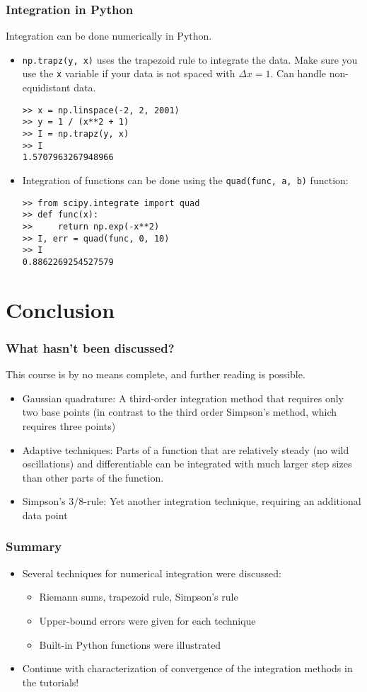 \begin{frame}[fragile]
  \frametitle{Integration in Python}
  Integration can be done numerically in Python.
  \begin{itemize}
    \item \lstinline$np.trapz(y, x)$ uses the trapezoid rule to integrate the data. Make sure you use the \lstinline$x$ variable if your data is not spaced with $\Delta x=1$. Can handle non-equidistant data.
    \begin{lstlisting}
>> x = np.linspace(-2, 2, 2001)
>> y = 1 / (x**2 + 1)
>> I = np.trapz(y, x)
>> I
1.5707963267948966
\end{lstlisting}
    \item Integration of functions can be done using the \lstinline$quad(func, a, b)$ function:
    \begin{lstlisting}
>> from scipy.integrate import quad
>> def func(x):
>>     return np.exp(-x**2)
>> I, err = quad(func, 0, 10)
>> I
0.8862269254527579
\end{lstlisting}
  \end{itemize}
\end{frame}


\section{Conclusion}
\begin{frame}
  \frametitle{What hasn't been discussed?}
  This course is by no means complete, and further reading is possible.
   \begin{itemize}
      \item Gaussian quadrature: A third-order integration method that requires only two base points (in contrast to the third order Simpson's method, which requires three points)
      \item Adaptive techniques: Parts of a function that are relatively steady (no wild oscillations) and differentiable can be integrated with much larger step sizes than other parts of the function.
      \item Simpson's 3/8-rule: Yet another integration technique, requiring an additional data point
   \end{itemize}
\end{frame}

\begin{frame}
  \frametitle{Summary}
  \begin{itemize}
    \item Several techniques for numerical integration were discussed:
    \begin{itemize}
      \item Riemann sums, trapezoid rule, Simpson's rule
      \item Upper-bound errors were given for each technique
      \item Built-in Python functions were illustrated
    \end{itemize}
    \item Continue with characterization of convergence of the integration methods in the tutorials!
  \end{itemize}
\end{frame}

